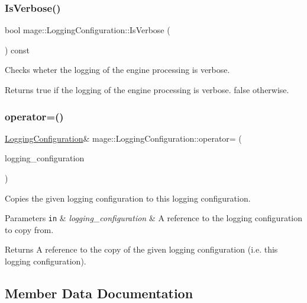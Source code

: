 \subsubsection{\texorpdfstring{Is\+Verbose()}{IsVerbose()}}
{\footnotesize\ttfamily bool mage\+::\+Logging\+Configuration\+::\+Is\+Verbose (\begin{DoxyParamCaption}{ }\end{DoxyParamCaption}) const}

Checks wheter the logging of the engine processing is verbose.

\begin{DoxyReturn}{Returns}
{\ttfamily true} if the logging of the engine processing is verbose. {\ttfamily false} otherwise. 
\end{DoxyReturn}
\hypertarget{structmage_1_1_logging_configuration_af19880c8b37ae454901a19dccdf4a297}{}\label{structmage_1_1_logging_configuration_af19880c8b37ae454901a19dccdf4a297} 
\subsubsection{\texorpdfstring{operator=()}{operator=()}}
{\footnotesize\ttfamily \hyperlink{structmage_1_1_logging_configuration}{Logging\+Configuration}\& mage\+::\+Logging\+Configuration\+::operator= (\begin{DoxyParamCaption}\item[{const \hyperlink{structmage_1_1_logging_configuration}{Logging\+Configuration} \&}]{logging\+\_\+configuration }\end{DoxyParamCaption})}

Copies the given logging configuration to this logging configuration.


\begin{DoxyParams}[1]{Parameters}
\mbox{\tt in}  & {\em logging\+\_\+configuration} & A reference to the logging configuration to copy from. \\
\hline
\end{DoxyParams}
\begin{DoxyReturn}{Returns}
A reference to the copy of the given logging configuration (i.\+e. this logging configuration). 
\end{DoxyReturn}


\subsection{Member Data Documentation}
\hypertarget{structmage_1_1_logging_configuration_a38f457d5db84d15e008841ca8653b47c}{}\label{structmage_1_1_logging_configuration_a38f457d5db84d15e008841ca8653b47c} 
